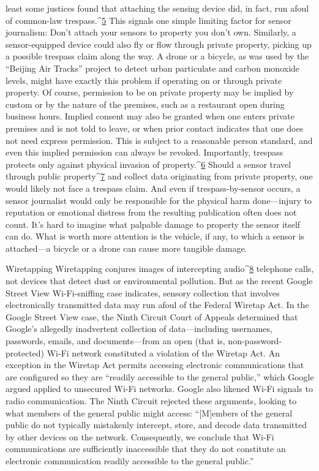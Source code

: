 least some justices found that attaching the sensing device did, in fact, run
afoul of common-law trespass.^{\href{#endnotes-syed}{5}} This signals one simple limiting factor for
sensor journalism: Don't attach your sensors to property you don't own.
Similarly, a sensor-equipped device could also fly or flow through private
property, picking up a possible trespass claim along the way. A drone or
a bicycle, as was used by the ``Beijing Air Tracks'' project to detect urban
particulate and carbon monoxide levels, might have exactly this problem if
operating on or through private property. Of course, permission to be on
private property may be implied by custom or by the nature of the premises,
such as a restaurant open during business hours. Implied consent may
also be granted when one enters private premises and is not told to leave,
or when prior contact indicates that one does not need express permission.
This is subject to a reasonable person standard, and even this implied permission
can always be revoked.
Importantly, trespass protects only against physical invasion of property.^{\href{#endnotes-syed}{6}}
Should a sensor travel through public property^{\href{#endnotes-syed}{7}} and collect data originating
from private property, one would likely not face a trespass claim. And even
if trespass-by-sensor occurs, a sensor journalist would only be responsible
for the physical harm done—injury to reputation or emotional distress from
the resulting publication often does not count. It's hard to imagine what
palpable damage to property the sensor itself can do. What is worth more
attention is the vehicle, if any, to which a sensor is attached—a bicycle or a
drone can cause more tangible damage.

Wiretapping
Wiretapping conjures images of intercepting audio^{\href{#endnotes-syed}{8}} telephone calls, not
devices that detect dust or environmental pollution. But as the recent
Google Street View Wi-Fi-sniffing case indicates, sensory collection that
involves electronically transmitted data may run afoul of the Federal Wiretap
Act.
In the Google Street View case, the Ninth Circuit Court of Appeals determined
that Google's allegedly inadvertent collection of data—including
usernames, passwords, emails, and documents—from an open (that is,
non-password-protected) Wi-Fi network constituted a violation of the
Wiretap Act. An exception in the Wiretap Act permits accessing electronic
communications that are configured so they are ``readily accessible to the
general public,'' which Google argued applied to unsecured Wi-Fi networks.
Google also likened Wi-Fi signals to radio communication. The Ninth Circuit
rejected these arguments, looking to what members of the general public
might access:
``[M]embers of the general public do not typically mistakenly intercept,
store, and decode data transmitted by other devices on the
network. Consequently, we conclude that Wi-Fi communications
are sufficiently inaccessible that they do not constitute an electronic
communication readily accessible to the general public.''

